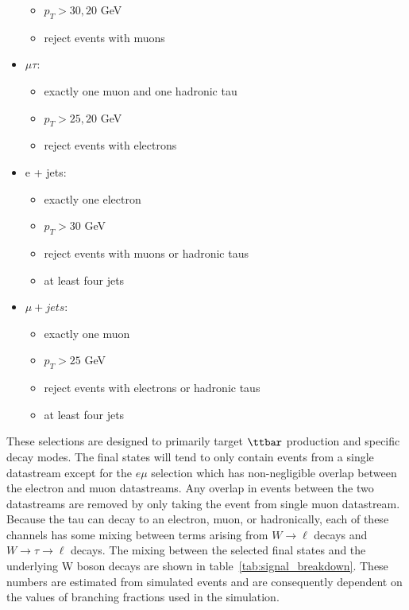 \begin{itemize}
\begin{itemize}
        \item $p_{T} > 30, 20$ GeV
        \item reject events with muons
    \end{itemize}
    \item $\mu\tau$:
    \begin{itemize}
        \item exactly one muon and one hadronic tau
        \item $p_{T} > 25, 20$ GeV
        \item reject events with electrons
    \end{itemize}
    \item e + jets:
    \begin{itemize}
        \item exactly one electron 
        \item $p_{T} > 30$ GeV
        \item reject events with muons or hadronic taus
        \item at least four jets
    \end{itemize}
    \item $\mu + jets$:
    \begin{itemize}
        \item exactly one muon 
        \item $p_{T} > 25$ GeV
        \item reject events with electrons or hadronic taus
        \item at least four jets
    \end{itemize}
\end{itemize}




These selections are designed to primarily target $\ttbar$ production and specific \PW decay modes. The final states will tend to only contain events from a single datastream except for the $e\mu$ selection which has non-negligible overlap between the electron and muon datastreams. Any overlap in events between the two datastreams are removed by only taking the event from single muon datastream. Because the tau can decay to an electron, muon, or hadronically, each of these channels has some mixing between terms arising from $W\rightarrow\ell$ decays and $W\rightarrow\tau\rightarrow\ell$ decays.  The mixing between the selected final states and the underlying W boson decays are shown in table~\ref{tab:signal_breakdown}. These numbers are estimated from simulated \ttbar events and are consequently dependent on the values of branching fractions used in the simulation.  

